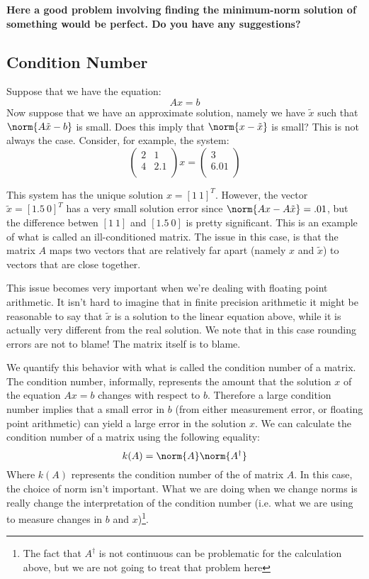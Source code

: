 {\bf Here a good problem involving finding the minimum-norm solution of something would be perfect. Do you have any suggestions?}

\subsection*{Condition Number}

Suppose that we have the equation:
\[
Ax= b
\]
Now suppose that we have an approximate solution, namely we have $\tilde{x}$ such that $\norm{A\tilde{x} -b}$ is small. Does this imply that $\norm{x-\tilde{x}}$ is small? This is not always the case. Consider, for example, the system:
\[
\begin{pmatrix}
2 & 1\\
4 & 2.1 \\
\end{pmatrix} x = 
\begin{pmatrix}
3 \\
6.01\\
\end{pmatrix}
\]

This system has the unique solution $x = [1~1]^T$. However, the vector $\tilde{x} = [1.5~0]^T$ has a very small solution error since $\norm{Ax-A\tilde{x}} = .01$, but the difference betwen $[1~1]$ and $[1.5~0]$ is pretty significant. This is an example of what is called an ill-conditioned matrix. The issue in this case, is that the matrix $A$ maps two vectors that are relatively far apart (namely $x$ and $\tilde{x}$) to vectors that are close together.

This issue becomes very important when we're dealing with floating point arithmetic. It isn't hard to imagine that in finite precision arithmetic it might be reasonable to say that $\tilde{x}$ is a solution to the linear equation above, while it is actually very different from the real solution. We note that in this case rounding errors are not to blame! The matrix itself is to blame.

We quantify this behavior with what is called the condition number of a matrix. The condition number, informally, represents the amount that the solution $x$ of the equation $Ax = b$ changes with respect to $b$. Therefore a large condition number implies that a small error in $b$ (from either measurement error, or floating point arithmetic) can yield a large error in the solution $x$. We can calculate the condition number of a matrix using the following equality:
\[
k(A) = \norm{A} \norm{A^\dagger}
\]
Where $k(A)$ represents the condition number of the of matrix $A$. In this case, the choice of norm isn't important. What we are  doing when we change norms is really change the interpretation of the condition number (i.e. what we are using to measure changes in $b$ and $x$)\footnote{The fact that $A^\dagger$ is not continuous can be problematic for the calculation above, but we are not going to treat that problem here}.

